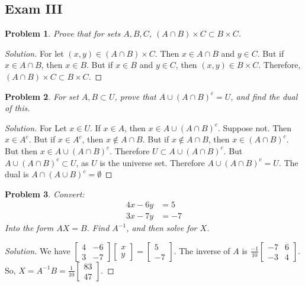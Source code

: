 \documentclass[oneside]{book}
\theoremstyle{mystyle}
\newtheorem{problem}{Problem}[section]
\begin{document}
\subsection{Exam III}
\begin{problem}
Prove that for sets $A,B,C$, $(A\cap B)\times C \subset B\times C$.
\end{problem}
\begin{proof}[Solution]
For let $(x,y) \in (A\cap B)\times C$. Then $x\in A\cap B$ and $y\in C$. But if $x\in A\cap B$, then $x\in B$. But if $x\in B$ and $y\in C$, then $(x,y) \in B\times C$. Therefore, $(A\cap B)\times C \subset B\times C$. 
\end{proof}
\begin{problem}
For set $A,B\subset U$, prove that $A\cup (A\cap B)^c = U$, and find the dual of this.
\end{problem}
\begin{proof}[Solution]
For Let $x\in U$. If $x\in A$, then $x\in A\cup (A\cap B)^c$. Suppose not. Then $x\in A^c$. But if $x\in A^c$, then $x\notin A\cap B$. But if $x\notin A\cap B$, then $x\in (A\cap B)^c$. But then $x\in A\cup (A\cap B)^c$. Therefore $U\subset A\cup (A\cap B)^c$. But $A\cup (A\cap B)^c \subset U$, as $U$ is the universe set. Therefore $A\cup (A\cap B)^c = U$. The dual is $A\cap (A\cup B)^c = \emptyset$
\end{proof}
\begin{problem}
Convert:
\begin{align*}
    4x-6y &= 5 \\
    3x-7y &= -7
\end{align*}
Into the form $AX = B$. Find $A^{-1}$, and then solve for $X$.
\end{problem}
\begin{proof}[Solution]
We have $\begin{bmatrix} 4 & -6 \\ 3 & -7 \end{bmatrix} \begin{bmatrix} x \\ y \end{bmatrix} = \begin{bmatrix} 5 \\ -7 \end{bmatrix}$. The inverse of $A$ is $\frac{-1}{10}\begin{bmatrix} -7 & 6 \\ -3 & 4\end{bmatrix}$. So, $X = A^{-1}B = \frac{1}{10} \begin{bmatrix}83 \\ 47 \end{bmatrix}$.
\end{proof}
\end{document}
